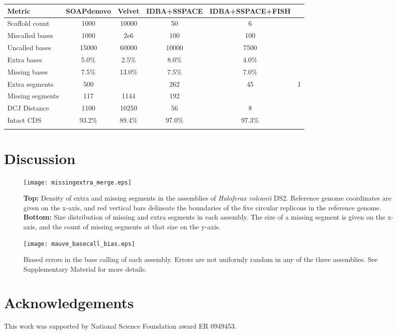 \documentclass{bioinfo}
\begin{document}
\begin{table}[!t]
{\begin{tabular}{l|cccc}\toprule
Metric & SOAPdenovo & Velvet & IDBA+SSPACE & IDBA+SSPACE+FISH \\\midrule
Scaffold count & 1000 & 10000 & 50  & 6 \\
Miscalled bases & 1000 & 2e6 & 100 & 100 \\
Uncalled bases & 15000 & 60000 & 10000 & 7500 \\
Extra bases & 5.0\% & 2.5\% & 8.0\% & 4.0\% \\
Missing bases & 7.5\% & 13.0\% & 7.5\% & 7.0\% \\
Extra segments & 500 &  & 262 & 45 & 1 \\
Missing segments & 117 & 1144 & 192 & \\
DCJ Distance & 1100 & 10250 & 56 & 8 \\
Intact CDS & 93.2\% & 89.4\% & 97.0\% & 97.3\% \\
\botrule
\end{tabular}}{}
\vspace{-1cm}
\end{table}



\section{Discussion}



\begin{figure}[t]
\texttt{[image: missingextra\_merge.eps]}
\vspace{-1cm}
\caption{\textbf{Top:} Density of extra and missing segments in the assemblies of \textit{Haloferax volcanii} DS2.
Reference genome coordinates are given on the x-axis, and red vertical bars delineate the boundaries of the
five circular replicons in the reference genome. \textbf{Bottom:} Size distribution of missing and extra segments in each assembly.  The size of a missing segment is given on the x-axis, and the count of missing segments at that size on the y-axis.}\label{fig:01}
\end{figure}

\begin{figure}[t]
\texttt{[image: mauve\_basecall\_bias.eps]}
\vspace{-1cm}
\caption{Biased errors in the base calling of each assembly. Errors are not uniformly random in any of the three assemblies. See Supplementary Material for more details.}\label{fig:02}
\end{figure}



\section*{Acknowledgements}
This work was supported by National Science Foundation award ER 0949453.



\end{document}
